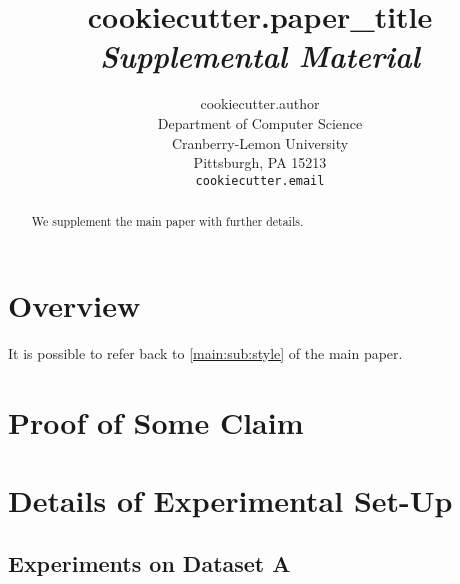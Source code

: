 \documentclass{article}
\title{
  {{cookiecutter.paper_title}} \\
  \vspace{5pt}
  \it
  Supplemental Material
}
\author{
  {{cookiecutter.author}} \\
  Department of Computer Science\\
  Cranberry-Lemon University\\
  Pittsburgh, PA 15213 \\
  \texttt{
    {{cookiecutter.email}}
  }
}
\newcommand{\crefmain}[1]{\cref{main:#1} of the main paper}
\begin{document}
\maketitle

\begin{abstract}
  We supplement the main paper with further details.
\end{abstract}

\section{Overview}
\label{sec:overview}

It is possible to refer back to \crefmain{sub:style}.

\section{Proof of Some Claim}
\label{sec:proof_of_some_claim}

\section{Details of Experimental Set-Up}
\label{sec:experimental_set_up}

\subsection{Experiments on Dataset A}
\label{sub:experiments_on_dataset_a}

\small

\nocite{*}



\end{document}
